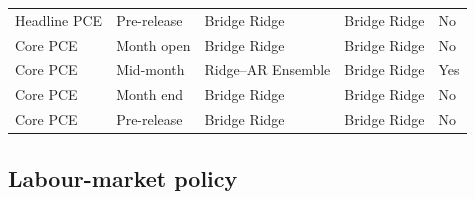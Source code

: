 \begin{table}[H]
\begin{tabular}{lllll}
Headline PCE & Pre-release & Bridge Ridge & Bridge Ridge & No \\

Core PCE & Month open & Bridge Ridge & Bridge Ridge & No \\

Core PCE & Mid-month & Ridge--AR Ensemble & Bridge Ridge & Yes \\

Core PCE & Month end & Bridge Ridge & Bridge Ridge & No \\

Core PCE & Pre-release & Bridge Ridge & Bridge Ridge & No \\

\bottomrule

\end{tabular}

\end{table}

\subsection{Labour-market policy}

